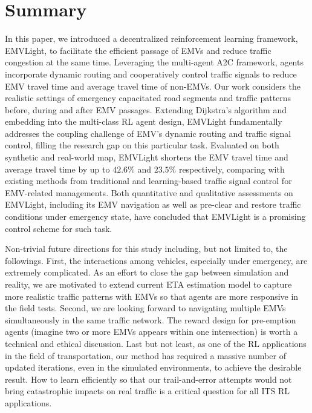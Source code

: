 \section{Summary}\label{sec_conclusion}
In this paper, we introduced a decentralized reinforcement learning framework, EMVLight, to facilitate the efficient passage of EMVs and reduce traffic congestion at the same time.
Leveraging the multi-agent A2C framework, agents incorporate dynamic routing and cooperatively control traffic signals to reduce EMV travel time and average travel time of non-EMVs.
Our work considers the realistic settings of emergency capacitated road segments and traffic patterns before, during and after EMV passages. Extending Dijkstra's algorithm and embedding into the multi-class RL agent design, EMVLight fundamentally addresses the coupling challenge of EMV's dynamic routing and traffic signal control, filling the research gap on this particular task.
Evaluated on both synthetic and real-world map, EMVLight shortens the EMV travel time and average travel time by up to $42.6\%$ and $23.5\%$ respectively, comparing with existing methods from traditional and learning-based traffic signal control for EMV-related managements. Both quantitative and qualitative assessments on EMVLight, including its EMV navigation as well as pre-clear and restore traffic conditions under emergency state, have concluded that EMVLight is a promising control scheme for such task.

Non-trivial future directions for this study including, but not limited to, the followings. First, the interactions among vehicles, especially under emergency, are extremely complicated. As an effort to close the gap between simulation and reality, we are motivated to extend current ETA estimation model to capture more realistic traffic patterns with EMVs so that agents are more responsive in the field tests. Second, we are looking forward to navigating multiple EMVs simultaneously in the same traffic network. The reward design for pre-emption agents (imagine two or more EMVs appears within one intersection) is worth a technical and ethical discussion. Last but not least, as one of the RL applications in the field of transportation, our method has required a massive number of updated iterations, even in the simulated environments, to achieve the desirable result. How to learn efficiently so that our trail-and-error attempts would not bring catastrophic impacts on real traffic is a critical question for all ITS RL applications.

